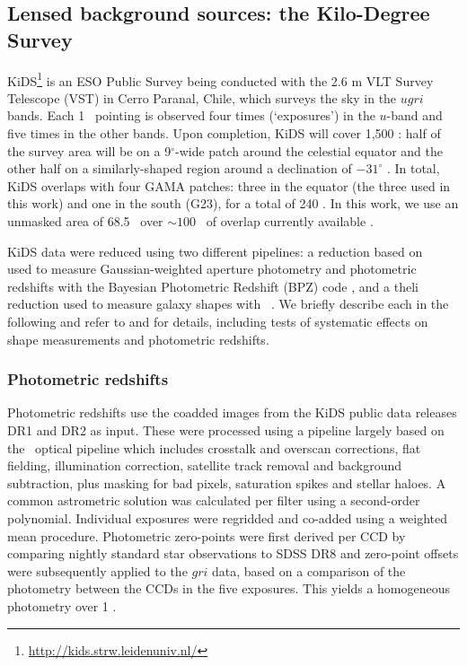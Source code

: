 \subsection{Lensed background sources: the Kilo-Degree Survey}\label{s:kids}

KiDS\footnote{\url{http://kids.strw.leidenuniv.nl/}} is an ESO Public Survey being conducted with 
the 2.6 m VLT Survey Telescope (VST) in Cerro Paranal, Chile, which surveys the sky in the $ugri$ 
bands. Each 1 \sqdeg\ pointing is observed four times (`exposures') in the $u$-band and five times 
in the other bands. Upon completion, KiDS will cover 1,500 \sqdeg: half of the survey area will be 
on a 9$^\circ$-wide patch around the celestial equator and the other half on a similarly-shaped 
region around a declination of $-31^\circ$ \citep{dejong13}. In total, KiDS overlaps with four GAMA 
patches: three in the equator (the three used in this work) and one in the south (G23), for a total 
of 240 \sqdeg. In this work, we use an unmasked area of 68.5 \sqdeg\ over $\sim100$ \sqdeg\ of 
overlap currently available \citep{dejong15}.

KiDS data were reduced using two different pipelines: a reduction based on \awise\ 
\citep{mcfarland13} used to measure Gaussian-weighted aperture photometry \citep{kuijken08} and 
photometric redshifts with the Bayesian Photometric Redshift (BPZ) code \citep{benitez00}, and a 
{\sc theli} reduction \citep{erben13} used to measure galaxy shapes with \lensfit\ 
\citep{miller07,miller13,kitching08}. We briefly describe each in the following and refer to 
\cite{dejong15} and \cite{kuijken15} for details, including tests of systematic effects on shape 
measurements and photometric redshifts.

\subsubsection{Photometric redshifts}\label{s:photoz}

Photometric redshifts use  the coadded images from the KiDS public data releases DR1 and DR2 
\citep{dejong15} as input. These were processed using a pipeline largely based on the \awise\ 
optical pipeline \citep{mcfarland13} which includes crosstalk and overscan corrections, flat 
fielding, illumination correction, satellite track removal and background subtraction, plus masking 
for bad pixels, saturation spikes and stellar haloes. A common astrometric solution was calculated 
per filter using a second-order polynomial. Individual exposures were regridded and co-added using a 
weighted mean procedure. Photometric zero-points were first derived per CCD by comparing nightly 
standard star observations to SDSS DR8 \citep{sdss8} and zero-point offsets were subsequently 
applied to the $gri$ data, based on a comparison of the photometry between the CCDs in the five 
exposures. This yields a homogeneous photometry over 1 \sqdeg.

